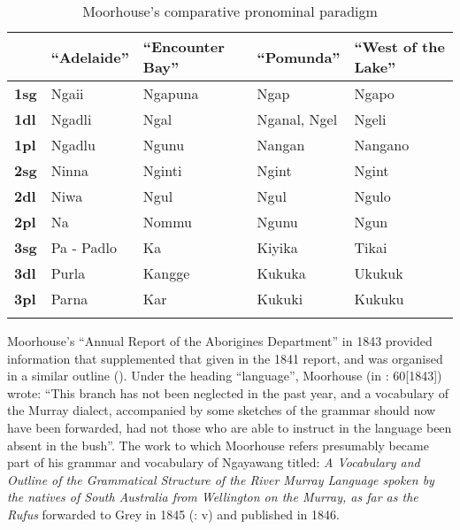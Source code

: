 \begin{table}
\begin{tabular}{p{1cm}p{2cm}p{2cm}p{2cm}p{2cm}}
\lsptoprule
& “Adelaide” & “Encounter Bay” & “Pomunda” & “West of \newline the Lake” \\
\midrule
\textbf{1sg} & Ngaii & Ngapuna & Ngap & Ngapo\\
\textbf{1dl} & Ngadli & Ngal & Nganal, Ngel & Ngeli\\
\textbf{1pl} & Ngadlu & Ngunu & Nangan & Nangano\\
\textbf{2sg} & Ninna & Nginti & Ngint & Ngint\\
\textbf{2dl} & Niwa & Ngul & Ngul & Ngulo\\
\textbf{2pl} & Na & Nommu & Ngunu & Ngun\\
\textbf{3sg} & Pa - Padlo & Ka & Kiyika & Tikai\\
\textbf{3dl} & Purla & Kangge & Kukuka & Ukukuk\\
\textbf{3pl} & Parna & Kar & Kukuki & Kukuku\\
\lspbottomrule
\end{tabular}
\caption{Moorhouse’s comparative pronominal paradigm \citeyearpar{moorhouse_letter_1840}}
\label{tab:key:117}
\end{table}

Moorhouse’s “Annual Report of the Aborigines Department” in 1843 provided information that supplemented that given in the 1841 report, and was organised in a similar outline (). Under the heading ``language'', Moorhouse (in \citet{foster_two_1990}: 60[1843]) wrote: “This branch has not been neglected in the past year, and a vocabulary of the Murray dialect, accompanied by some sketches of the grammar should now have been forwarded, had not those who are able to instruct in the language been absent in the bush”. The work to which Moorhouse refers presumably became part of his grammar and vocabulary of Ngayawang titled: \textit{A Vocabulary and Outline of the Grammatical Structure of the River Murray Language spoken by the natives of South Australia from Wellington on the Murray, as far as the Rufus} forwarded to Grey in 1845 (\citealt{moorhouse_vocabulary_1846}: v) and published in 1846.

